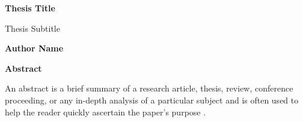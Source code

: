 \thispagestyle{plain}
    \Large
    \textbf{Thesis Title}
        
    \vspace{0.4cm}
    \large
    Thesis Subtitle
        
    \vspace{0.4cm}
    \textbf{Author Name}
       
    \vspace{0.9cm}
    \textbf{Abstract}
    \begin{displayquote}
    An abstract is a brief summary of a research article, thesis, review, conference proceeding, or any in-depth analysis of a particular subject and is often used to help the reader quickly ascertain the paper's purpose \parencite{wikipedia-abstract}.
    \end{displayquote}
